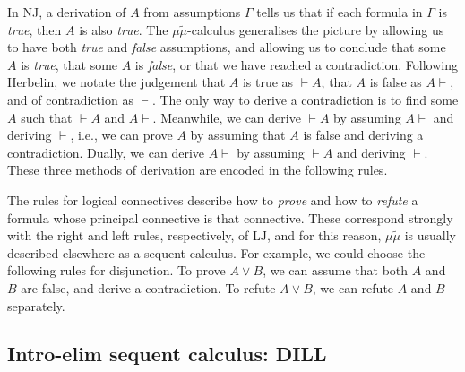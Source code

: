 In NJ, a derivation of $A$ from assumptions $\Gamma$ tells us that if each
formula in $\Gamma$ is \emph{true}, then $A$ is also \emph{true}.
The $\mu\tilde\mu$-calculus generalises the picture by allowing us to have
both \emph{true} and \emph{false} assumptions, and allowing us to conclude that
some $A$ is \emph{true}, that some $A$ is \emph{false}, or that we have reached
a contradiction.
Following Herbelin, we notate the judgement that $A$ is true as ${}\vdash A$,
that $A$ is false as $A \vdash{}$, and of contradiction as $\vdash$.
The only way to derive a contradiction is to find some $A$ such that
${}\vdash A$ and $A \vdash{}$.
Meanwhile, we can derive ${}\vdash A$ by assuming $A \vdash{}$ and deriving
$\vdash$, i.e., we can prove $A$ by assuming that $A$ is false and deriving a
contradiction.
Dually, we can derive $A \vdash{}$ by assuming ${}\vdash A$ and deriving
$\vdash$.
These three methods of derivation are encoded in the following rules.


The rules for logical connectives describe how to \emph{prove} and how to
\emph{refute} a formula whose principal connective is that connective.
These correspond strongly with the right and left rules, respectively, of LJ,
and for this reason, $\mu\tilde\mu$ is usually described elsewhere as a
sequent calculus.
For example, we could choose the following rules for disjunction.
To prove $A \vee B$, we can assume that both $A$ and $B$ are false, and derive
a contradiction.
To refute $A \vee B$, we can refute $A$ and $B$ separately.


\subsection{Intro-elim sequent calculus: DILL}

